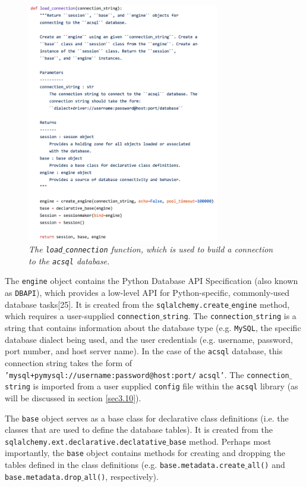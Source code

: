 \documentclass[10pt,journal,compsoc]{IEEEtran}
\begin{document}
\begin{figure}[!h]
\centering
\includegraphics[width=3.3in]{./figures/load_connection.png}
\caption{\textit{The \texttt{load$\_$connection} function, which is used to build a connection to the \texttt{acsql} database.}}
\label{fig12}
\end{figure}

The \texttt{engine} object contains the Python Database API Specification (also known as \texttt{DBAPI}), which provides a low-level API for Python-specific, commonly-used
database tasks[25].  It is created from the \texttt{sqlalchemy.create$\_$engine} method, which requires a user-supplied \texttt{connection$\_$string}.  The \texttt{connection$\_$string}
is a string that contains information about the database type (e.g. \texttt{MySQL}, the specific database dialect being used, and the user credentials (e.g. username, password, port number,
and host server name).  In the case of the \texttt{acsql} database, this connection string takes the form of \texttt{'mysql+pymysql://username:password@host:port/} \texttt{acsql'}.
The \texttt{connection$\_$string} is imported from a user supplied \texttt{config} file within the \texttt{acsql} library (as will be discussed in section \ref{sec3.10}).

The \texttt{base} object serves as a base class for declarative class definitions (i.e. the classes that are used to define the database tables).  It is created from the
\texttt{sqlalchemy.ext.declarative.declatative$\_$base} method.  Perhaps most importantly, the \texttt{base} object contains methods for creating and dropping the tables defined in
the class definitions (e.g. \texttt{base.metadata.create$\_$all()} and \texttt{base.metadata.drop$\_$all()}, respectively).
\end{document}
